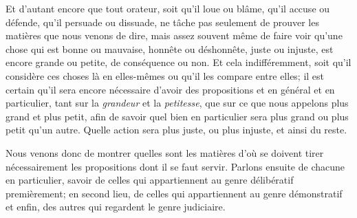 \bigbreak

Et d'autant encore que tout orateur, soit qu'il loue ou blâme, qu'il accuse ou défende, qu'il persuade ou dissuade, ne tâche
pas seulement de prouver les matières que nous venons de dire, mais assez souvent même de faire voir qu'une chose qui est bonne
ou mauvaise, honnête ou déshonnête, juste ou injuste, est encore grande ou petite, de conséquence ou non. Et cela indifféremment,
soit qu'il considère ces choses là en elles-mêmes ou qu'il les compare entre elles; il est certain qu'il sera encore nécessaire
d'avoir des propositions et en général et en particulier, tant sur la \emph{grandeur} et la \emph{petitesse}, que sur ce que nous
appelons plus grand et plus petit, afin de savoir quel bien en particulier sera plus grand ou plus petit qu'un autre. Quelle
action sera plus juste, ou plus injuste, et ainsi du reste. 

Nous venons donc de montrer quelles sont les matières d'où se doivent tirer nécessairement les propositions dont il se faut servir.
Parlons ensuite de chacune en particulier, savoir de celles qui appartiennent au genre délibératif premièrement; en second lieu,
de celles qui appartiennent au genre démonstratif et enfin, des autres qui regardent le genre judiciaire. 

